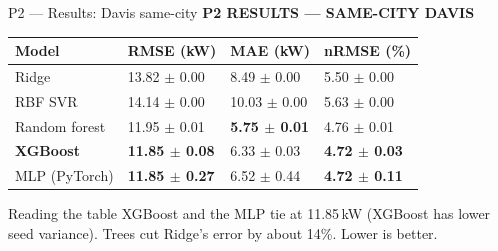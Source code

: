 \documentclass[aspectratio=169,11pt]{beamer}
\newcommand{\sectiontag}[1]{{\footnotesize\usebeamercolor[fg]{structure}\textbf{#1}}\par\vspace{0.10cm}}
\begin{document}
\begin{frame}{P2 — Results: Davis same-city}
\sectiontag{P2 \quad RESULTS — SAME-CITY DAVIS}
\small
\begin{tabularx}{\linewidth}{@{}P{3.15cm}YYY@{}}\toprule
\textbf{Model} & \textbf{RMSE (kW)} & \textbf{MAE (kW)} & \textbf{nRMSE (\%)} \\\midrule
Ridge & 13.82 $\pm$ 0.00 & 8.49 $\pm$ 0.00 & 5.50 $\pm$ 0.00 \\
RBF SVR & 14.14 $\pm$ 0.00 & 10.03 $\pm$ 0.00 & 5.63 $\pm$ 0.00 \\
Random forest & 11.95 $\pm$ 0.01 & \textbf{5.75 $\pm$ 0.01} & 4.76 $\pm$ 0.01 \\
\textbf{XGBoost} & \textbf{11.85 $\pm$ 0.08} & 6.33 $\pm$ 0.03 & \textbf{4.72 $\pm$ 0.03} \\
MLP (PyTorch) & \textbf{11.85 $\pm$ 0.27} & 6.52 $\pm$ 0.44 & \textbf{4.72 $\pm$ 0.11} \\
\bottomrule\end{tabularx}\par
\vspace{0.25cm}
\begin{block}{Reading the table}
\footnotesize XGBoost and the MLP tie at 11.85\,kW (XGBoost has lower seed variance). Trees cut Ridge's error by about 14\%. Lower is better.
\end{block}
\end{frame}
\end{document}
